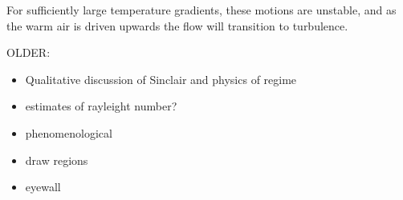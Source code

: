 For sufficiently large temperature gradients, these motions are
unstable, and as the warm air is driven upwards the flow will transition
to turbulence. 

OLDER:
\begin{itemize}
\item Qualitative discussion of Sinclair and physics of regime
\item estimates of rayleight number?
\item phenomenological 
\item draw regions
\item eyewall
\end{itemize}
